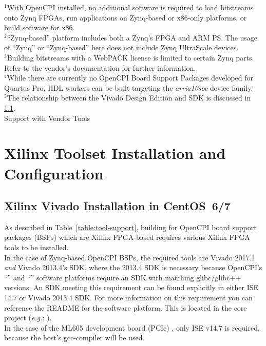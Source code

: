 \begin{flushleft}
\begin{landscape}
\begin{center}
\begin{table}[H]
		\footnotesize{$^1$With OpenCPI installed, no additional software is required to load bitstreams onto Zynq FPGAs, run applications on Zynq-based or x86-only platforms, or build software for x86.}\\
		\footnotesize{$^2$``Zynq-based'' platform includes both a Zynq's FPGA and ARM PS. The usage of ``Zynq'' or ``Zynq-based'' here does not include Zynq UltraScale devices.}\\
		\footnotesize{$^3$Building bitstreams with a WebPACK license is limited to certain Zynq parts. Refer to the vendor's documentation for further information.}\\
		\footnotesize{$^4$While there are currently no OpenCPI Board Support Packages developed for Quartus Pro, HDL workers can be built targeting the \textit{arria10soc} device family.}\\
		\footnotesize{$^5$The relationship between the Vivado Design Edition and SDK is discussed in \ref{sec:viv_intro}.}\\
		\caption {Support with Vendor Tools}
		\label{table:tool-support} %
	\end{table}
\end{center}
\end{landscape}

\section{Xilinx Toolset Installation and Configuration}
\subsection{Xilinx Vivado Installation in CentOS~6/7}
\label{sec:viv_intro}
\begin{flushleft}
As described in Table~\ref{table:tool-support}, building for OpenCPI board support packages (BSPs) which are Xilinx FPGA-based requires various Xilinx FPGA tools to be installed. \\
In the case of Zynq-based OpenCPI BSPs, the required tools are Vivado 2017.1 \textit{and} Vivado 2013.4's SDK, where the 2013.4 SDK is necessary because OpenCPI's ``'' and ``'' software platforms require an SDK with matching glibc/glibc++ versions. An SDK meeting this requirement can be found explicitly in either ISE 14.7 or Vivado 2013.4 SDK. For more information on this requirement you can reference the README for the  software platform. This is located in the core project (\textit{e.g.}: ).\\
In the case of the ML605 development board (PCIe) , only ISE v14.7 is required, because the host's gcc-compiler will be used.


\end{flushleft}
\end{flushleft}
